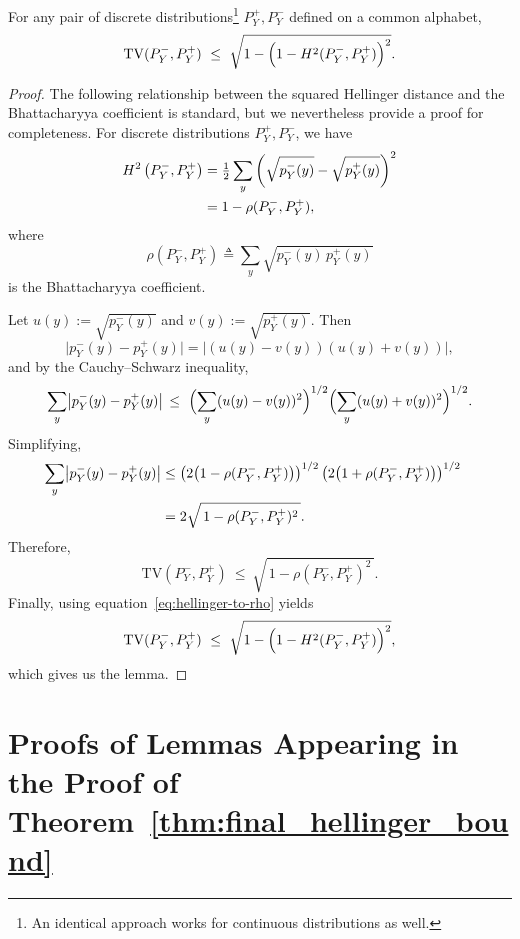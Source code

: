 \documentclass[10pt]{article} %
\def\eqref#1{equation~\ref{#1}}
\theoremstyle{plain}
\theoremstyle{definition}
\theoremstyle{remark}
\newcommand{\svcomment}[1]{\textcolor{red}{SV: #1}}
\newcommand{\rkcomment}[1]{\textcolor{blue}{RK: #1}}
\begin{document}
\begin{lemma}\label{lem:bound_tv_sqhellinger}
For any pair of discrete distributions\footnote{An identical approach works for continuous distributions as well.} $P_{Y}^+,P_{Y}^-$ defined on a common alphabet,
\[
\mathrm{TV}(P_Y^-,P_Y^+)
\ \le\ \sqrt{1 - \Bigl(1 - H^2(P_Y^-,P_Y^+)\Bigr)^2}.
\]
\end{lemma}
\begin{proof}
The following relationship between the squared Hellinger distance and the Bhattacharyya coefficient is standard, but we nevertheless provide a proof for completeness. For discrete distributions $P_Y^+,P_{Y}^-$, we have
\begin{align}
H^2 \left(P_Y^-,P_Y^+\right)
&= \tfrac{1}{2}\sum_{y} \left(\sqrt{p_Y^-(y)} - \sqrt{p_Y^+(y)}\right)^2   \notag\\
&= 1 - \rho(P_Y^-,P_Y^+), \label{eq:hellinger-to-rho}
\end{align}
where
\[
\rho(P_Y^-,P_Y^+) \triangleq \sum_y\sqrt{p_Y^-(y)\,p_Y^+(y)}
\]
is the Bhattacharyya coefficient.

Let \(u(y) := \sqrt{p_Y^-(y)}\) and \(v(y) := \sqrt{p_Y^+(y)}\).  
Then
\[
\bigl|p_Y^-(y) - p_Y^+(y)\bigr| = |(u(y) - v(y))(u(y) + v(y))|,
\]
and by the Cauchy--Schwarz inequality,
\[
\sum_y \bigl|p_Y^-(y) - p_Y^+(y)\bigr| \, 
 \le\ \Bigl(\sum_y (u(y) - v(y))^2 \Bigr)^{1/2}
       \Bigl(\sum_y (u(y) + v(y))^2 \Bigr)^{1/2}.
\]
Simplifying,
\begin{align}
    \sum_y \bigl|p_Y^-(y) - p_Y^+(y)\bigr|  &\le \left( 2\bigl(1 - \rho(P_Y^-,P_Y^+)\bigr) \right)^{1/2} \left(  2\bigl(1 + \rho(P_Y^-,P_Y^+)\bigr)\right)^{1/2} &\notag\\
    &=2\sqrt{\,1 - \rho(P_Y^-,P_Y^+)^2\,}.
\end{align}
Therefore,
\[
\mathrm{TV}(P_Y^-,P_Y^+)
\ \le\ \sqrt{\,1 - \rho(P_Y^-,P_Y^+)^2\,}.
\]
Finally, using \eqref{eq:hellinger-to-rho} yields
\[
\mathrm{TV}(P_Y^-,P_Y^+)
\ \le\ \sqrt{1 - \Bigl(1 - H^2(P_Y^-,P_Y^+)\Bigr)^2},
\]
which gives us the lemma.  
\end{proof}




\section{Proofs of Lemmas Appearing in the Proof of Theorem~\ref{thm:final_hellinger_bound}}\label{prf:thm:lemmas_proofs_thm_Tx}
\end{document}
